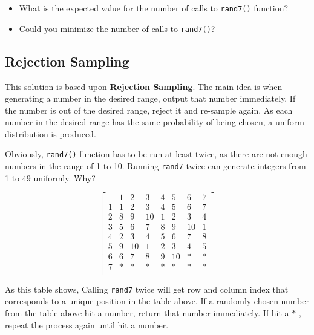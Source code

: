 \begin{itemize}
\item What is the expected value for the number of calls to \lstinline[language=C++, basicstyle=\small\ttfamily, keywordstyle=\bfseries\color{green!40!black}]|rand7()| function?
\item Could you minimize the number of calls to \lstinline[language=C++, basicstyle=\small\ttfamily, keywordstyle=\bfseries\color{green!40!black}]|rand7()|?
\end{itemize}

\subsection{Rejection Sampling}

This solution is based upon \textbf{Rejection Sampling}. The main idea is when generating a number in the desired range, output that number immediately. If the number is out of the desired range, reject it and re-sample again. As each number in the desired range has the same probability of being chosen, a uniform distribution is produced.

Obviously, \texttt{rand7()} function has to be run at least twice, as there are not enough numbers in the range of 1 to 10. Running \texttt{rand7} twice can generate integers from 1 to 49 uniformly. Why?

\[
\begin{bmatrix}
 & \mathit{1} & \mathit{2} & \mathit{3} & \mathit{4} & \mathit{5} & \mathit{6} & \mathit{7} \\
\mathit{1} & 1 & 2 & 3 & 4 & 5 & 6 & 7 \\ 
\mathit{2} & 8 & 9 & 10 & 1 & 2 & 3 & 4 \\
\mathit{3} & 5 & 6 & 7 & 8 & 9 & 10 & 1\\
\mathit{4} & 2 & 3 & 4 & 5 & 6 & 7 & 8 \\
\mathit{5} & 9 & 10 & 1 & 2 & 3 & 4 & 5 \\
\mathit{6} & 6 & 7 & 8 & 9 & 10 & \ast & \ast \\
\mathit{7} & \ast & \ast & \ast & \ast & \ast & \ast & \ast \\
\end{bmatrix}
\]

As this table shows, Calling \texttt{rand7} twice will get row and column index that corresponds to a unique position in the table above. If a randomly chosen number from the table above hit a number, return that number immediately. If hit a $\ast$ , repeat the process again until hit a number.

